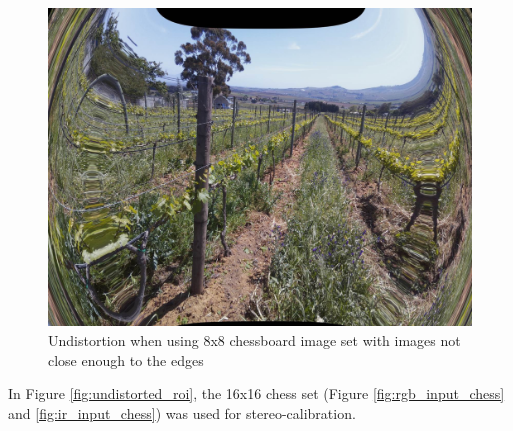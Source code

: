 \begin{figure}[H]
\centering
\includegraphics[scale=0.25]{images/incorrectly_undistorted.jpg}
\caption{Undistortion when using 8x8 chessboard image set with images not close enough to the edges}
\label{fig:incorrectly_undistorted}
\end{figure}

In Figure \ref{fig:undistorted_roi}, the 16x16 chess set (Figure \ref{fig:rgb_input_chess} and \ref{fig:ir_input_chess}) was used for stereo-calibration.

